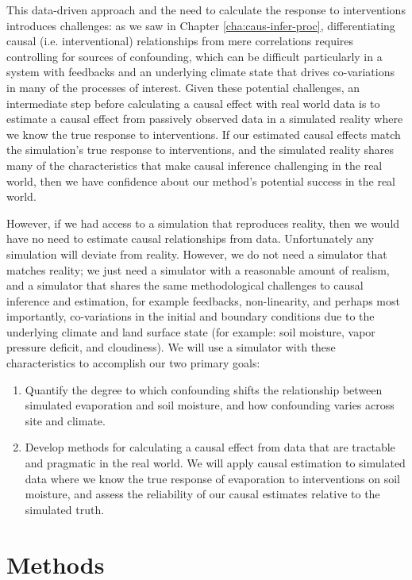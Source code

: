 This data-driven approach and the need to calculate the response to
interventions introduces challenges: as we saw in Chapter
\ref{cha:caus-infer-proc}, differentiating causal
(i.e. interventional) relationships from mere correlations requires
controlling for sources of confounding\cite{pearl2009}, which can be
difficult particularly in a system with feedbacks and an underlying
climate state that drives co-variations in many of the processes of
interest. Given these potential challenges, an intermediate step
before calculating a causal effect with real world data is to estimate
a causal effect from passively observed data in a simulated reality
where we know the true response to interventions. If our estimated
causal effects match the simulation's true response to interventions,
and the simulated reality shares many of the characteristics that make
causal inference challenging in the real world, then we have
confidence about our method's potential success in the real world.

However, if we had access to a simulation that reproduces reality,
then we would have no need to estimate causal relationships from data.
Unfortunately any simulation will deviate from reality. However, we do
not need a simulator that matches reality; we just need a simulator
with a reasonable amount of realism, and a simulator that shares the
same methodological challenges to causal inference and estimation, for
example feedbacks, non-linearity, and perhaps most importantly,
co-variations in the initial and boundary conditions due to the
underlying climate and land surface state (for example: soil moisture,
vapor pressure deficit, and cloudiness). We will use a simulator with
these characteristics to accomplish our two primary goals:

\begin{enumerate}
  \item Quantify the degree to which confounding shifts the
    relationship between simulated evaporation and soil moisture, and
    how confounding varies across site and climate.
\item Develop methods for calculating a causal effect from data that
  are tractable and pragmatic in the real world. We will apply causal
  estimation to simulated data where we know the true response of
  evaporation to interventions on soil moisture, and assess the
  reliability of our causal estimates relative to the simulated truth.
\end{enumerate}

\section{Methods}
\label{sec:methods-sm-caus}

